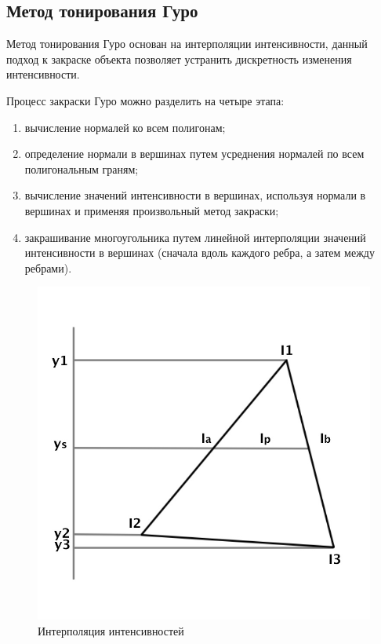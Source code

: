 \subsection{Метод тонирования Гуро}
\hspace{0.6cm}Метод тонирования Гуро основан на интерполяции интенсивности, данный подход к закраске объекта позволяет устранить дискретность изменения интенсивности.

\vspace{0.3cm}Процесс закраски Гуро можно разделить на четыре этапа:
\begin{enumerate}
	\item вычисление нормалей ко всем полигонам;
	\item определение нормали в вершинах путем усреднения нормалей по всем полигональным граням;
	\item вычисление значений интенсивности в вершинах, используя нормали в вершинах и применяя произвольный метод закраски;
	\item закрашивание многоугольника путем линейной интерполяции значений интенсивности в вершинах (сначала вдоль каждого ребра, а затем между ребрами).
\end{enumerate}


\begin{figure}[ht!]
	\centering
	\includegraphics[scale=0.45]{guro}
	\caption{Интерполяция интенсивностей}
	\label{fig:guro}
\end{figure}

